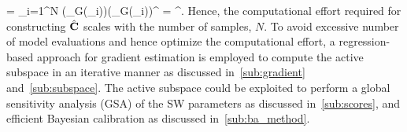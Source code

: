  \approx {} = \sum\limits_{i=1}^{N} 
 (\nabla_{\vec{\xi}}G(\vec{\xi}_i))(\nabla_{\vec{\xi}}G(\vec{\xi}_i))^\top
 = \hat{\mat{\Lambda}}^\top.
\label{eq:chat}
 \ee
Hence, the computational effort required for constructing $\hat{\mathbf{{C}}}$ scales with the number of samples, $N$.
To avoid excessive number of model evaluations and hence optimize the computational effort, a regression-based
approach for gradient estimation is employed to compute the active subspace
in an iterative manner as discussed in~\ref{sub:gradient} and~\ref{sub:subspace}. The
active subspace could be exploited to perform a global sensitivity analysis (GSA) of the SW parameters as discussed in~\ref{sub:scores}, and efficient Bayesian calibration as discussed
in~\ref{sub:ba_method}.



































